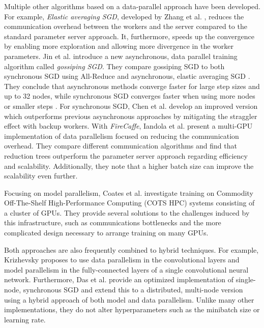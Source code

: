 \documentclass[conference,compsoc,a4paper]{IEEEtran}
\begin{document}
Multiple other algorithms based on a data-parallel approach have been developed.
%
For example, \emph{Elastic averaging SGD}, developed by Zhang et al. \cite{zhang2015-Elastic-AvgSGD}, reduces the communication overhead between the workers and the server compared to the standard parameter server approach.
It, furthermore, speeds up the convergence by enabling more exploration and allowing more divergence in the worker parameters.
%
Jin et al. \cite{jin2016-How-to-scale} introduce a new asynchronous, data parallel training algorithm called \emph{gossiping SGD}.
They compare gossiping SGD to both synchronous SGD using All-Reduce and asynchronous, elastic averaging SGD \cite{zhang2015-Elastic-AvgSGD}.
They conclude that asynchronous methods converge faster for large step sizes and up to 32 nodes, while synchronous SGD converges faster when using more nodes or smaller steps \cite{jin2016-How-to-scale}.
%
For synchronous SGD, Chen et al. \cite{chen2016-Revisiting-distributed-synchronous-SGD} develop an improved version which outperforms previous asynchronous approaches by mitigating the straggler effect with backup workers.
%
With \emph{FireCaffe}, Iandola et al. \cite{iandola2016-Firecaffe} present a multi-GPU implementation of data parallelism focused on reducing the communication overhead.
They compare different communication algorithms and find that reduction trees outperform the parameter server approach regarding efficiency and scalability.
Additionally, they note that a higher batch size can improve the scalability even further.

Focusing on model parallelism, Coates et al. \cite{coates2013-DL-COTS-HPC} investigate training on Commodity Off-The-Shelf High-Performance Computing (COTS HPC) systems consisting of a cluster of GPUs.
They provide several solutions to the challenges induced by this infrastructure, such as communications bottlenecks and the more complicated design necessary to arrange training on many GPUs.

Both approaches are also frequently combined to hybrid techniques.
For example, Krizhevsky \cite{krizhevsky2014-One-weird-trick} proposes to use data parallelism in the convolutional layers and model parallelism in the fully-connected layers of a single convolutional neural network.
%
Furthermore, Das et al. \cite{das2016-Distributed-deep-learning} provide an optimized implementation of single-node, synchronous SGD and extend this to a distributed, multi-node version using a hybrid approach of both model and data parallelism.
Unlike many other implementations, they do not alter hyperparameters such as the minibatch size or learning rate.
\end{document}
